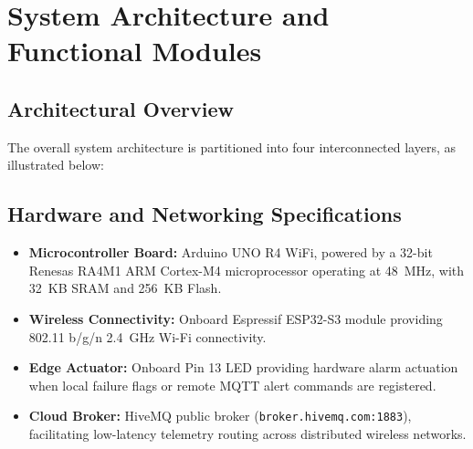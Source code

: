 \documentclass[11pt,a4paper]{article}
\begin{document}
\section{System Architecture and Functional Modules}

\subsection{Architectural Overview}
The overall system architecture is partitioned into four interconnected layers, as illustrated below:

\begin{center}
\end{center}

\subsection{Hardware and Networking Specifications}
\begin{itemize}
    \item \textbf{Microcontroller Board:} Arduino UNO R4 WiFi, powered by a 32-bit Renesas RA4M1 ARM Cortex-M4 microprocessor operating at 48~MHz, with 32~KB SRAM and 256~KB Flash.
    \item \textbf{Wireless Connectivity:} Onboard Espressif ESP32-S3 module providing 802.11 b/g/n 2.4~GHz Wi-Fi connectivity.
    \item \textbf{Edge Actuator:} Onboard Pin 13 LED providing hardware alarm actuation when local failure flags or remote MQTT alert commands are registered.
    \item \textbf{Cloud Broker:} HiveMQ public broker (\texttt{broker.hivemq.com:1883}), facilitating low-latency telemetry routing across distributed wireless networks.
\end{itemize}
\end{document}
